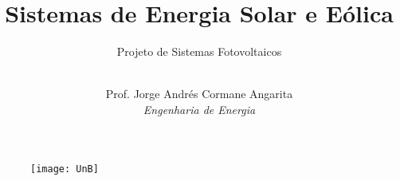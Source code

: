 
\begin{frame}

\begin{center}
	\begin{figure}[H]
		\texttt{[image: UnB]}
	\end{figure}
\end{center}

\title{Sistemas de Energia Solar e Eólica}

\subtitle{\vspace{.5cm} Projeto de Sistemas Fotovoltaicos}

\author{
	\vspace{.5cm}\\
	Prof. Jorge Andrés Cormane Angarita\\
	{\it Engenharia de Energia}\\
}
	
\date{}
	
\titlepage

\end{frame}